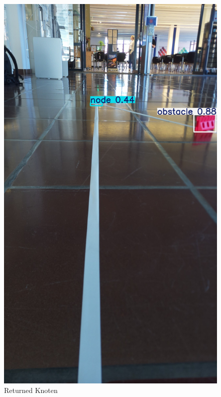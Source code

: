 \begin{figure}[H]
  \centering
    \begin{minipage}[b]{0.23\textwidth}
    \centering
    \includegraphics[width=\textwidth]{assets/IT/testing/yolo/node-obst-on-the-side_annot.png}
    \caption{Returned Knoten}
    \label{fig:expl-algo-1}
  \end{minipage}
  \hfill
  \begin{minipage}[b]{0.23\textwidth}
    \centering

\end{minipage}
\end{figure}
